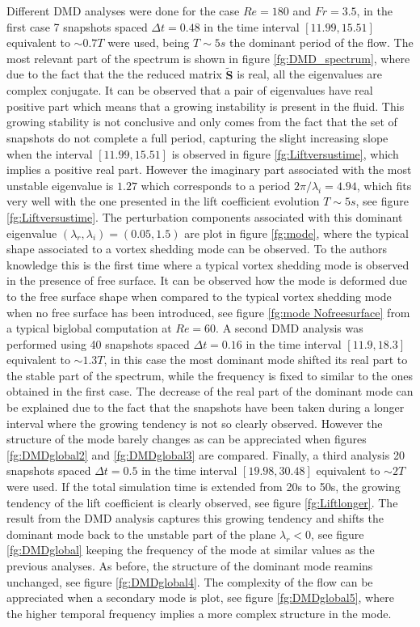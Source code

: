 Different DMD analyses were done for the case $Re=180$ and $Fr=3.5$, in the first case 7 snapshots spaced $\Delta t=0.48$ in the time interval $[11.99,15.51]$ equivalent to $\sim0.7T$ were used, being $T\sim5s$ the dominant period of the flow. The most relevant part of the spectrum is shown in figure \ref{fg:DMD_spectrum}, where due to the fact that the the reduced matrix $\mathbf{\widetilde{S}}$ is real, all the eigenvalues are complex conjugate. It can be observed that a pair of eigenvalues have real positive part which means that a growing instability is present in the fluid. This growing stability is not conclusive and only comes from the fact that the set of snapshots do not complete a full period, capturing the slight increasing slope when the interval $[11.99,15.51]$ is observed in figure \ref{fg:Liftversustime}, which implies a positive real part. However the imaginary part associated with the most unstable eigenvalue is $1.27$ which corresponds to a period $2\pi/\lambda_i=4.94$, which fits very well 
with the one presented in the lift coefficient evolution $T\sim5s$, see figure \ref{fg:Liftversustime}. The perturbation components associated with this dominant eigenvalue $(\lambda_r,\lambda_i)=(0.05,1.5)$ are plot in figure \ref{fg:mode}, where the typical shape associated to a vortex shedding mode can be observed. To the authors knowledge this is the first time where a typical vortex shedding mode is observed in the presence of free surface. It can be observed how the mode is deformed due to the free surface shape when compared to the typical vortex shedding mode when no free surface has been introduced, see figure \ref{fg:mode Nofreesurface} from a typical biglobal computation at $Re=60$. A second DMD analysis was performed using 40 snapshots spaced $\Delta t=0.16$ in the time interval $[11.9,18.3]$ equivalent to $\sim 1.3T$, in this case the most dominant mode shifted its real part to the stable part of the spectrum, while the frequency is fixed to similar to the ones obtained in the first case. The 
decrease of the real part of the dominant mode can be explained due to the fact that the snapshots have been taken during a longer interval where the growing tendency is not so clearly observed. However the structure of the mode barely changes as can be appreciated when figures \ref{fg:DMDglobal2} and \ref{fg:DMDglobal3} are compared. Finally, a third analysis 20 snapshots spaced $\Delta t=0.5$ in the time interval $[19.98,30.48]$ equivalent to $\sim2T$ were used. If the total simulation time is extended from 20s to 50s, the growing tendency of the lift coefficient is clearly observed, see figure \ref{fg:Liftlonger}. The result from the DMD analysis captures this growing tendency and shifts the dominant mode back to the unstable part of the plane $\lambda_r<0$, see figure \ref{fg:DMDglobal} keeping the frequency of the mode at similar values as the previous analyses. As before, the structure of the dominant mode reamins unchanged, see figure \ref{fg:DMDglobal4}. The complexity of the flow can be appreciated 
when a secondary mode is plot, see figure \ref{fg:DMDglobal5}, where the higher temporal frequency implies a more complex structure in the mode.



